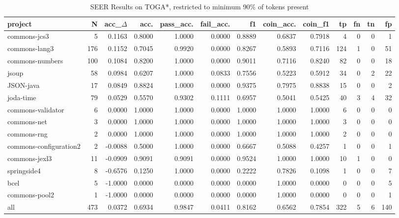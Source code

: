\begin{table*}
\centering
\caption{SEER Results on TOGA*, restricted to minimum 90\% of tokens present}
\label{tab:toga_results_10}
\begin{tabular}{lrrrrrrrrrrrr}
\toprule
                project &    N &  acc\_$\Delta$ &    acc. &  pass\_acc. &  fail\_acc. &      f1 &  coin\_acc. &  coin\_f1 &   tp &  fn &  tn &   fp \\
\midrule
           commons-jcs3 &    5 &      0.1163 &  0.8000 &     1.0000 &     0.0000 &  0.8889 &     0.6837 &   0.7918 &    4 &   0 &   0 &    1 \\
          commons-lang3 &  176 &      0.1152 &  0.7045 &     0.9920 &     0.0000 &  0.8267 &     0.5893 &   0.7116 &  124 &   1 &   0 &   51 \\
        commons-numbers &  100 &      0.1084 &  0.8200 &     1.0000 &     0.0000 &  0.9011 &     0.7116 &   0.8240 &   82 &   0 &   0 &   18 \\
                  jsoup &   58 &      0.0984 &  0.6207 &     1.0000 &     0.0833 &  0.7556 &     0.5223 &   0.5912 &   34 &   0 &   2 &   22 \\
              JSON-java &   17 &      0.0849 &  0.8824 &     1.0000 &     0.0000 &  0.9375 &     0.7975 &   0.8838 &   15 &   0 &   0 &    2 \\
              joda-time &   79 &      0.0529 &  0.5570 &     0.9302 &     0.1111 &  0.6957 &     0.5041 &   0.5425 &   40 &   3 &   4 &   32 \\
      commons-validator &    6 &      0.0000 &  1.0000 &     1.0000 &     0.0000 &  1.0000 &     1.0000 &   1.0000 &    6 &   0 &   0 &    0 \\
            commons-net &    3 &      0.0000 &  1.0000 &     1.0000 &     0.0000 &  1.0000 &     1.0000 &   1.0000 &    3 &   0 &   0 &    0 \\
            commons-rng &    2 &      0.0000 &  1.0000 &     1.0000 &     0.0000 &  1.0000 &     1.0000 &   1.0000 &    2 &   0 &   0 &    0 \\
 commons-configuration2 &    2 &     -0.0088 &  0.5000 &     1.0000 &     0.0000 &  0.6667 &     0.5088 &   0.4257 &    1 &   0 &   0 &    1 \\
          commons-jexl3 &   11 &     -0.0909 &  0.9091 &     0.9091 &     0.0000 &  0.9524 &     1.0000 &   1.0000 &   10 &   1 &   0 &    0 \\
            springside4 &    8 &     -0.6576 &  0.1250 &     1.0000 &     0.0000 &  0.2222 &     0.7826 &   0.1098 &    1 &   0 &   0 &    7 \\
                   bcel &    5 &     -1.0000 &  0.0000 &     0.0000 &     0.0000 &  0.0000 &     1.0000 &   0.0000 &    0 &   0 &   0 &    5 \\
          commons-pool2 &    1 &     -1.0000 &  0.0000 &     0.0000 &     0.0000 &  0.0000 &     1.0000 &   0.0000 &    0 &   0 &   0 &    1 \\
                    all &  473 &      0.0372 &  0.6934 &     0.9847 &     0.0411 &  0.8162 &     0.6562 &   0.7854 &  322 &   5 &   6 &  140 \\
\bottomrule
\end{tabular}
\end{table*}
